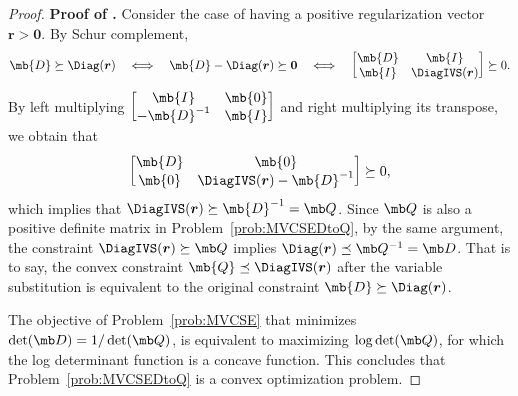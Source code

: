 \documentclass[opre, blindrev]{informs4}
\newcommand{\1}[1]{\mathds{1}{\left(#1\right)}}
\begin{document}
\begin{appendices}
\begin{proof}{\bf Proof of .}
Consider the case of having a positive regularization vector $\bm r > \bm 0$. By Schur complement,
$$
\mb{D} \succeq \Diag(\bm r)
~~~\Longleftrightarrow~~~
\mb{D} - \Diag(\bm r) \succeq \bm 0  
~~~\Longleftrightarrow~~~
\begin{bmatrix}
\mb{D} & \mb{I} \\
\mb{I} & \DiagIVS(\bm r) \\ 
\end{bmatrix} \succeq 0.
$$
By left multiplying 
$\begin{bmatrix}
\mb{I} & \mb{0} \\
- \mb{D}^{-1} & \mb{I}
\end{bmatrix}$ and right multiplying its transpose, we obtain that
$$
\begin{bmatrix}
\mb{D} & \mb{0} \\
\mb{0} & \DiagIVS(\bm r) - \mb{D}^{-1}\\ 
\end{bmatrix} \succeq 0,
$$
which implies that $\DiagIVS(\bm r) \succeq \mb{D}^{-1} = \mb Q$. Since $\mb Q$ is also a positive definite matrix in Problem~\eqref{prob:MVCSEDtoQ}, by the same argument, the constraint $\DiagIVS(\bm r) \succeq \mb Q$ implies $\Diag(\bm r) \preceq \mb Q^{-1} = \mb D$. That is to say, the convex constraint $\mb{Q} \preceq \DiagIVS(\bm r)$ after the variable substitution is equivalent to the original constraint $\mb{D} \succeq \Diag(\bm r)$.

The objective of Problem~\eqref{prob:MVCSE} that minimizes 
$\det(\mb D)=1/\det(\mb Q)$, is equivalent to maximizing $\log\det(\mb Q)$, for which the log determinant function is a concave function. This concludes that Problem~\eqref{prob:MVCSEDtoQ} is a convex optimization problem.
\hfill \Halmos
\end{proof}
\vspace{3mm}


\end{appendices}
\end{document}
